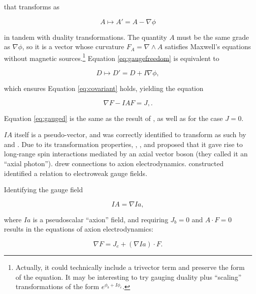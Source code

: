 \documentclass{article}
\begin{document}
  that transforms as

  \begin{equation}
    A \mapsto A' = A - \nabla \phi\label{eq:gaugefreedom}
  \end{equation}

  in tandem with duality transformations. The quantity $A$ must be the same grade as $\nabla \phi$, so it is a vector whose curvature $F_A = \nabla \wedge A$ satisfies Maxwell's equations without magnetic sources.\footnote{Actually, it could technically include a trivector term and preserve the form of the equation. It may be interesting to try gauging duality plus ``scaling'' transformations of the form $e^{\phi_b + I \phi_e}$.} Equation \ref{eq:gaugefreedom} is equivalent to

  \begin{equation}
    D \mapsto D' = D + I \nabla \phi,
  \end{equation}

  which ensures Equation \ref{eq:covariant} holds, yielding the equation

  \begin{equation}
    \nabla F - I A F = J,\label{eq:gauged}.
  \end{equation}

  Equation \ref{eq:gauged} is the same as the result of \cite{tiwari}, as well as \cite{malik} for the case $J=0$.

  $IA$ itself is a pseudo-vector, and was correctly identified to transform as such by \cite{malik} and \cite{tiwari}. Due to its transformation properties, \cite{malik}, \cite{naik}, and \cite{pmn} proposed that it gave rise to long-range spin interactions mediated by an axial vector boson (they called it an ``axial photon''). \cite{tiwari}  drew connections to axion electrodynamics. \cite{vasconcellos} constructed identified a relation to electroweak gauge fields.

  Identifying the gauge field

  \begin{equation}
    IA = \nabla I a,
  \end{equation}

  where $Ia$ is a pseudoscalar ``axion'' field, and requiring $J_b = 0$ and $A \cdot F = 0$ results in the equations of axion electrodynamics:

  \begin{equation}
    \nabla F = J_e + (\nabla I a) \cdot F.
  \end{equation}
\end{document}
